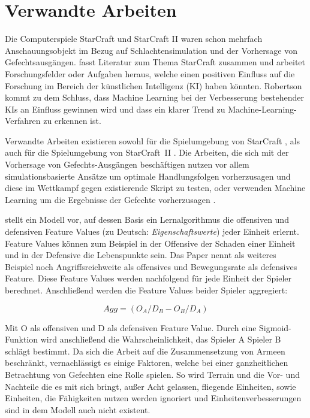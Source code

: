 \section{Verwandte Arbeiten}
\label{VerwandteArbeiten}

Die Computerspiele StarCraft und StarCraft II waren schon mehrfach Anschauungsobjekt im Bezug auf Schlachtensimulation und der Vorhersage von Gefechtsausgängen. \textcite{AAAI:aimag/Robertson14} fasst Literatur zum Thema StarCraft zusammen und arbeitet Forschungsfelder oder Aufgaben heraus, welche einen positiven Einfluss auf die Forschung im Bereich der künstlichen Intelligenz (KI) haben könnten. Robertson kommt zu dem Schluss, dass Machine Learning bei der Verbesserung bestehender KIs an Einfluss gewinnen wird und dass ein klarer Trend zu Machine-Learning-Verfahren zu erkennen ist. 

Verwandte Arbeiten existieren sowohl für die Spielumgebung von StarCraft \parencite{AIIDE137381, DBLP:conf/aiide/ChurchillSB12, AIIDE1511531, SnchezRuizGranados2015PredictingTO, 6633643, 6374183}, als auch für die Spielumgebung von StarCraft~II \parencite{DBLP:journals/corr/HelmkeKW14, samvelyan2019starcraft}. Die Arbeiten, die sich mit der Vorhersage von Gefechts-Ausgängen beschäftigen nutzen vor allem simulationsbasierte Ansätze  \parencite{6633643, DBLP:conf/aiide/ChurchillSB12, DBLP:journals/corr/HelmkeKW14} um optimale Handlungsfolgen vorherzusagen und diese im Wettkampf gegen existierende Skript zu testen, oder verwenden Machine Learning um die Ergebnisse der Gefechte vorherzusagen \parencite{SnchezRuizGranados2015PredictingTO, AIIDE137381, AIIDE1511531}.


\textcite{AIIDE137381} stellt ein Modell vor, auf dessen Basis ein Lernalgorithmus die offensiven und defensiven Feature Values (zu Deutsch: \textit{Eigenschaftswerte}) jeder Einheit erlernt. Feature Values können zum Beispiel in der Offensive der Schaden einer Einheit und in der Defensive die Lebenspunkte sein. Das Paper nennt als weiteres Beispiel noch Angriffsreichweite als offensives und Bewegungsrate als defensives Feature. Diese Feature Values werden nachfolgend für jede Einheit der Spieler berechnet. Anschließend werden die Feature Values beider Spieler aggregiert:

\begin{equation}
Agg = (O_A / D_B - O_B / D_A)
\end{equation}

Mit O als offensiven und D als defensiven Feature Value. Durch eine Sigmoid-Funktion wird anschließend die Wahrscheinlichkeit, das Spieler A Spieler B schlägt bestimmt. Da sich die Arbeit auf die Zusammensetzung von Armeen beschränkt, vernachlässigt es einige Faktoren, welche bei einer ganzheitlichen Betrachtung von Gefechten eine Rolle spielen. So wird Terrain und die Vor- und Nachteile die es mit sich bringt, außer Acht gelassen, fliegende Einheiten, sowie Einheiten, die Fähigkeiten nutzen werden ignoriert und Einheitenverbesserungen sind in dem Modell auch nicht existent. 


